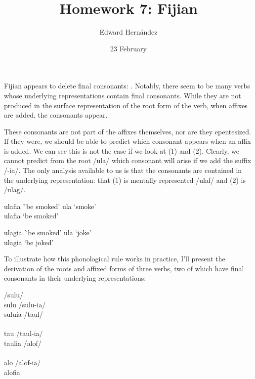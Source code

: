 \documentclass[doc,12pt]{apa6}
\begin{document}
\title{Homework 7: Fijian}
\author{Edward Hern\'{a}ndez}
\date{23 February}
\maketitle

Fijian appears to delete final consonants:
. Notably, there seem to be many
verbs whose underlying representations contain final consonants.  While they
are not produced in the surface representation of the root form of the verb,
when affixes are added, the consonants appear.

These consonants are not part of the affixes themselves, nor are they
epentesized. If they were, we should be able to predict which consonant appears
when an affix is added. We can see this is not the case if we look at (1) and
(2). Clearly, we cannot predict from the root /ula/ which consonant will arise
if we add the suffix /-ia/. The only analysis available to us is that the
consonants are contained in the underlying representation: that (1) is mentally
represented /ulaf/ and (2) is /ulag/.

\begin{exe}
	\ex \begin{tabbing}
		ulafia \= `be smoked' \kill
		ula \> `smoke' \\
		ulafia \> `be smoked'
		\end{tabbing}
	\ex \begin{tabbing}
		ulagia \= `be smoked' \kill
		ula \> `joke' \\
		ulagia \> `be joked'
		\end{tabbing}
\end{exe}

To illustrate how this phonological rule works in practice, I'll present the 
derivation of the roots and affixed forms of three verbs, two of which have 
final consonants in their underlying representations:

\begin{exe}
	\ex /sulu/ \\
		sulu
	\ex /sulu-ia/ \\
		suluia
	\ex /taul/ \\
		 \\
		tau
	\ex /taul-ia/ \\
		taulia
	\ex /alof/ \\
		 \\
		alo
	\ex /alof-ia/ \\
		alofia
\end{exe}
\end{document}
